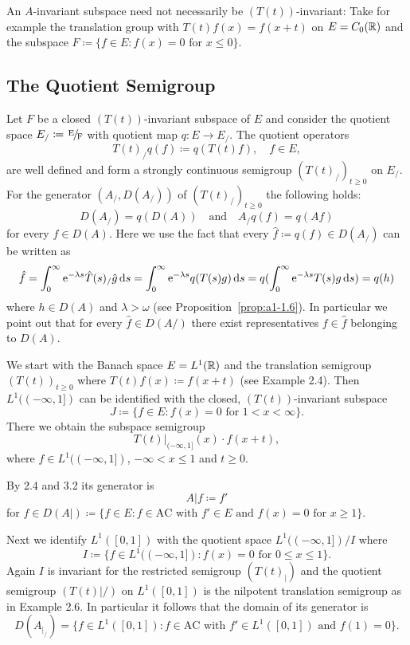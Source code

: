 An $A$-invariant subspace need not necessarily be $(T(t))$-invariant:
Take for example the translation group with $T(t)f(x) = f(x+t)$ on $E = C_{0}(\mathbb{R})$ and the subspace $F \coloneqq \{f \in E \colon f(x) = 0 \text{ for } x \leq 0\}$.
\subsection{The Quotient Semigroup}\label{subsec:a1-3.4}%
Let $F$ be a closed $(T(t))$-invariant subspace of $E$ and consider the quotient space $ E_{/}\coloneqq \sfrac{E}{F} $ with quotient map $q \colon E \to E_{/}$. 
The quotient operators
\[
    T(t)_{/}q(f) \coloneqq q(T(t)f), \quad f \in E,
\]
are well defined and form a strongly continuous semigroup $(T(t)_{/})_{t \geq 0}$ on $E_{/}$.
For the generator $(A_{/},D(A_{/}))$ of $(T(t)_{/})_{t \geq 0}$ the following holds:
\[
    D(A_{/}) = q(D(A)) 
    \quad \text{and} \quad 
    A_{/}q(f) = q(Af)
\]
for every $f \in D(A)$.
Here we use the fact that every $\hat{f} \coloneqq q(f) \in D(A_{/})$ can be written as
\[
    \hat{f} = \int_{0}^{\infty}  \mathrm{e}^{-\lambda s} \hat{T}(s)_{/}\hat{g} \mathop{}\!\mathrm{d}{s} 
    = \int_{0}^{\infty}  \mathrm{e}^{-\lambda s}q(T(s)g) \mathop{}\!\mathrm{d}{s} 
    = q(\int_{0}^{\infty}  \mathrm{e}^{-\lambda s}T(s)g \mathop{}\!\mathrm{d}{s}) = q(h)
\]
where $h \in D(A)$ and $\lambda > \omega$ (see Proposition~\ref{prop:a1-1.6}).
In particular we point out that for every $\hat{f} \in D(A/)$ there exist representatives $f \in \hat{f}$ belonging to $D(A)$.
\begin{example*}\label{ex:a1-3.1}%
We start with the Banach space $E = L^{1}(\mathbb{R})$ and the translation semigroup $(T(t))_{t \geq 0}$ where $T(t)f(x) \coloneqq f(x+t)$ (see Example 2.4).
Then $L^{1}((-\infty,1])$ can be identified with the closed, $(T(t))$-invariant subspace
\[
    J \coloneqq \{f \in E \colon f(x) = 0 \text{ for } 1 < x < \infty\} .
\]
There we obtain the subspace semigroup
\[
    T(t)|_{(-\infty,1]}(x) \cdot f(x+t),
\]
where $f \in L^{1}((-\infty,1])$, $-\infty < x \leq 1$ and $t \geq 0$.

By 2.4 and 3.2 its generator is
\[
    A|f \coloneqq f'
\]
for $f \in D(A|) \coloneqq \{f \in E \colon f \in \text{AC} \text{ with } f' \in E \text{ and } f(x) = 0 \text{ for } x \geq 1\}$.

Next we identify $L^{1}(\left[ 0,1 \right])$ with the quotient space $L^{1}((-\infty,1])/I$ where
\[
    I \coloneqq \{f \in L^{1}((-\infty,1]) \colon f(x) = 0 \text{ for } 0 \leq x \leq 1\} .
\]
Again $I$ is invariant for the restricted semigroup $(T(t)_{|})$ and the
quotient semigroup $(T(t)|/)$ on $L^{1}(\left[ 0,1 \right])$ is the nilpotent translation semigroup as in Example 2.6.
In particular it follows that the domain of its generator is
\[
    D(A_{|_{/}}) = \{f \in L^{1}(\left[ 0,1 \right]) \colon f \in \text{AC} \text{ with } f' \in L^{1}(\left[ 0,1 \right]) \text{ and } f(1) = 0\}.
\]
\end{example*}
